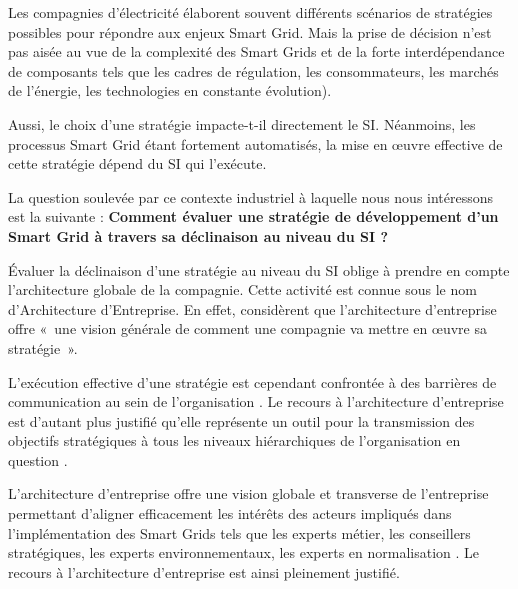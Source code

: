 Les compagnies d'électricité élaborent souvent différents scénarios de stratégies possibles pour répondre aux enjeux Smart Grid. Mais la prise de décision n'est pas aisée au vue de la complexité des Smart Grids et de la forte interdépendance de composants tels que les cadres de régulation, les consommateurs, les marchés de l'énergie, les technologies en constante évolution). 

Aussi, le choix d'une stratégie impacte-t-il directement le SI. Néanmoins, les processus Smart Grid étant fortement automatisés, la mise en œuvre effective de cette stratégie dépend du SI qui l'exécute.

La question soulevée par ce contexte industriel à laquelle nous nous intéressons est la suivante : \textbf{Comment évaluer une stratégie de développement d'un Smart Grid à travers sa déclinaison au niveau du SI ?}

Évaluer la déclinaison d'une stratégie au niveau du SI oblige à prendre en compte l'architecture globale de la compagnie. %
Cette activité est connue sous le nom d'Architecture d'Entreprise. En effet, \cite{ross2006enterprise} considèrent que l'architecture d'entreprise offre «~une vision générale de comment une compagnie va mettre en \oe{}uvre sa stratégie~». 

L'exécution effective d'une stratégie est cependant confrontée à des barrières de communication au sein de l'organisation \cite{vcater2010factors}. Le recours à l'architecture d'entreprise est d'autant plus justifié qu'elle représente un outil pour la transmission des objectifs stratégiques à tous les niveaux hiérarchiques de l'organisation en question \cite{kappelman2008enterprise}. 

L'architecture d'entreprise offre une vision globale et transverse de l'entreprise \cite{zachman1987framework}  permettant d'aligner efficacement les intérêts des acteurs impliqués dans l'implémentation des Smart Grids tels que les experts métier, les conseillers stratégiques, les experts environnementaux, les experts en normalisation \cite{buckl2010conceptual}. Le recours à l'architecture d'entreprise est ainsi pleinement justifié.

